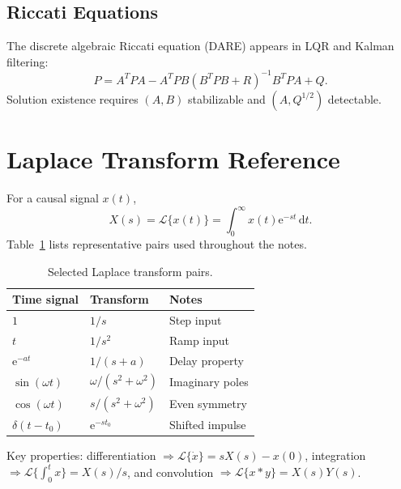 \subsection{Riccati Equations}
The discrete algebraic Riccati equation (DARE) appears in LQR and Kalman filtering:
\begin{equation}
    P = A^T P A - A^T P B (B^T P B + R)^{-1} B^T P A + Q.
\end{equation}
Solution existence requires $(A, B)$ stabilizable and $(A, Q^{1/2})$ detectable.

\section{Laplace Transform Reference}
For a causal signal $x(t)$,
\[
    X(s) = \mathcal{L}\{x(t)\} = \int_{0}^{\infty} x(t) \mathrm{e}^{-s t}\, \mathrm{d}t.
\]
Table~\ref{tab:laplace-pairs} lists representative pairs used throughout the notes.
\begin{table}[h]
    \centering
    \begin{tabular}{lll}
        \toprule
        Time signal & Transform & Notes \\
        \midrule
        $1$ & $1/s$ & Step input \\
        $t$ & $1/s^2$ & Ramp input \\
        $\mathrm{e}^{-a t}$ & $1/(s + a)$ & Delay property \\
        $\sin(\omega t)$ & $\omega/(s^2 + \omega^2)$ & Imaginary poles \\
        $\cos(\omega t)$ & $s/(s^2 + \omega^2)$ & Even symmetry \\
        $\delta(t - t_0)$ & $\mathrm{e}^{-s t_0}$ & Shifted impulse \\
        \bottomrule
    \end{tabular}
    \caption{Selected Laplace transform pairs.}
    \label{tab:laplace-pairs}
\end{table}
Key properties: differentiation $\Rightarrow \mathcal{L}\{\dot{x}\} = s X(s) - x(0)$, integration $\Rightarrow \mathcal{L}\{\int_{0}^{t} x\} = X(s)/s$, and convolution $\Rightarrow \mathcal{L}\{x * y\} = X(s) Y(s)$.

